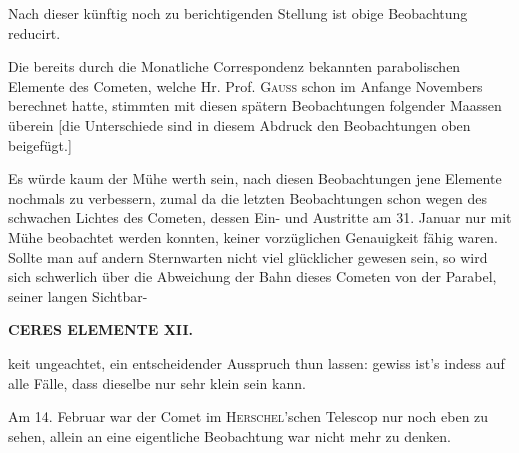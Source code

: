 \noindent Nach dieser künftig noch zu berichtigenden Stellung ist obige Beobachtung reducirt.

\par\indent Die bereits durch die Monatliche Correspondenz bekannten parabolischen Elemente des Cometen,
welche Hr. Prof. \textsc{Gauss} schon im Anfange Novembers berechnet hatte, stimmten mit diesen
spätern Beobachtungen folgender Maassen überein [die Unterschiede sind in diesem Abdruck den
Beobachtungen oben beigefügt.]

\par\indent Es würde kaum der Mühe werth sein, nach diesen Beobachtungen jene Elemente nochmals zu verbessern,
zumal da die letzten Beobachtungen schon wegen des schwachen Lichtes des Cometen, dessen Ein- und
Austritte am 31. Januar nur mit Mühe beobachtet werden konnten, keiner vorzüglichen Genauigkeit
fähig waren. Sollte man auf andern Sternwarten nicht viel glücklicher gewesen sein, so wird sich
schwerlich über die Abweichung der Bahn dieses Cometen von der Parabel, seiner langen Sichtbar-\par
\clearpage
\thispagestyle{empty}
\noindent{}%
\makebox[12mm][l]{}%
\parbox[t]{\dimexpr\linewidth-24mm\relax}{\centering\footnotesize\bfseries CERES ELEMENTE XII.\par}%
\par\nobreak\medskip
\noindent keit ungeachtet, ein entscheidender Ausspruch thun lassen: gewiss ist's indess auf alle Fälle,
dass dieselbe nur sehr klein sein kann.

\par\indent Am 14. Februar war der Comet im \textsc{Herschel}'schen Telescop nur noch eben zu sehen, allein an
eine eigentliche Beobachtung war nicht mehr zu denken.
